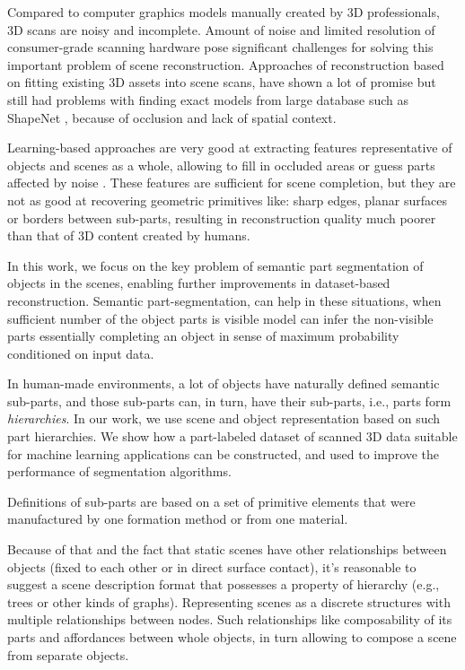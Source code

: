 Compared to computer graphics models manually created by 3D professionals, 3D scans are noisy and incomplete.
Amount of noise and limited resolution of consumer-grade scanning hardware pose significant challenges for solving this important problem of scene reconstruction. 
Approaches of reconstruction based on fitting existing 3D assets into scene scans, have shown a lot of promise but still had problems with finding exact models from large database such as ShapeNet \cite{chang2015shapenet}, because of occlusion and lack of spatial context.

Learning-based approaches are very good at extracting features representative of objects and scenes as a whole, allowing to fill in occluded areas or guess parts affected by noise \cite{dai2017shape,dai2018scancomplete,song2017semantic}. These features are sufficient for scene completion, but they are not as good at recovering geometric primitives like: sharp edges, planar surfaces or borders between sub-parts, resulting in reconstruction quality much poorer than that of 3D content created by humans.

In this work, we focus on the key problem of semantic part segmentation of objects in the scenes, enabling further improvements in  dataset-based reconstruction. 
Semantic part-segmentation, can help in these situations, when sufficient number of the object parts is visible model can infer the non-visible parts essentially completing an object in sense of maximum probability conditioned on input data.

In human-made environments, a lot of objects have naturally defined semantic sub-parts, and those sub-parts can, in turn, have their sub-parts, i.e., parts form \emph{hierarchies}.  In our work, we use scene and object representation based on such part hierarchies.  We show how a part-labeled dataset of scanned 3D data suitable for machine learning applications can be constructed, and used to improve the performance of segmentation algorithms. 

Definitions of sub-parts are based on a set of primitive elements that were manufactured by one formation method or from one material.

Because of that and the fact that static scenes have other relationships between objects (fixed to each other or in direct surface contact), it's reasonable to suggest a scene description format that possesses a property of hierarchy (e.g., trees or other kinds of graphs).
Representing scenes as a discrete structures with multiple relationships between nodes. Such relationships like composability of its parts and affordances between whole objects, in turn allowing to compose a scene from separate objects.

